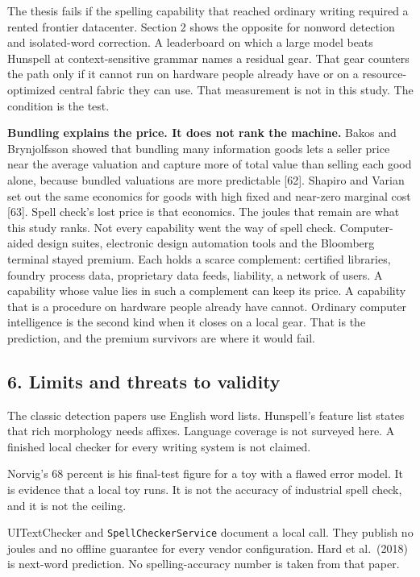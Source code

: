 \documentclass[
  10pt,
]{article}
\begin{document}
The thesis fails if the spelling capability that reached ordinary
writing required a rented frontier datacenter. Section 2 shows the
opposite for nonword detection and isolated-word correction. A
leaderboard on which a large model beats Hunspell at context-sensitive
grammar names a residual gear. That gear counters the path only if it
cannot run on hardware people already have or on a resource-optimized
central fabric they can use. That measurement is not in this study. The
condition is the test.

\textbf{Bundling explains the price. It does not rank the machine.}
Bakos and Brynjolfsson showed that bundling many information goods lets
a seller price near the average valuation and capture more of total
value than selling each good alone, because bundled valuations are more
predictable {[}62{]}. Shapiro and Varian set out the same economics for
goods with high fixed and near-zero marginal cost {[}63{]}. Spell
check's lost price is that economics. The joules that remain are what
this study ranks. Not every capability went the way of spell check.
Computer-aided design suites, electronic design automation tools and the
Bloomberg terminal stayed premium. Each holds a scarce complement:
certified libraries, foundry process data, proprietary data feeds,
liability, a network of users. A capability whose value lies in such a
complement can keep its price. A capability that is a procedure on
hardware people already have cannot. Ordinary computer intelligence is
the second kind when it closes on a local gear. That is the prediction,
and the premium survivors are where it would fail.

\subsection{6. Limits and threats to
validity}\label{limits-and-threats-to-validity}

The classic detection papers use English word lists. Hunspell's feature
list states that rich morphology needs affixes. Language coverage is not
surveyed here. A finished local checker for every writing system is not
claimed.

Norvig's 68 percent is his final-test figure for a toy with a flawed
error model. It is evidence that a local toy runs. It is not the
accuracy of industrial spell check, and it is not the ceiling.

UITextChecker and \texttt{SpellCheckerService} document a local call.
They publish no joules and no offline guarantee for every vendor
configuration. Hard et al.~(2018) is next-word prediction. No
spelling-accuracy number is taken from that paper.
\end{document}
